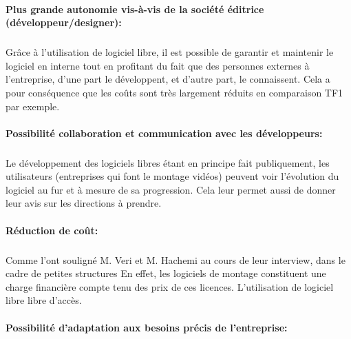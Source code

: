 \begin{itemize}
\paragraph{Plus grande autonomie vis-à-vis de la société éditrice
(développeur/designer):}

  \subparagraph{ }

    Grâce à l'utilisation de logiciel libre, il est possible de
    garantir et maintenir le logiciel en interne tout en profitant
    du fait que des personnes externes à l'entreprise, d'une part
    le développent, et d'autre part, le connaissent. Cela a pour
    conséquence que les coûts sont très largement réduits en
    comparaison %
    TF1 par  exemple.

\paragraph{Possibilité collaboration et communication avec les
développeurs:}

  \subparagraph{}

  Le développement des logiciels libres étant en principe fait
  publiquement, les utilisateurs (entreprises qui font le montage
  vidéos) peuvent voir l'évolution du logiciel au fur et à mesure
  de sa progression. Cela leur permet aussi de donner leur avis sur les
  directions à prendre.

\paragraph{Réduction de coût:}

\subparagraph{}

Comme l'ont souligné  M. Veri et M. Hachemi au cours de leur interview,
dans le cadre de petites structures %
En effet, %
les logiciels de montage constituent une charge financière %
compte tenu des prix de ces licences. L'utilisation de logiciel libre
libre d'accès.

\paragraph{Possibilité d'adaptation aux besoins précis de l'entreprise:}

\subparagraph{}


\end{itemize}
